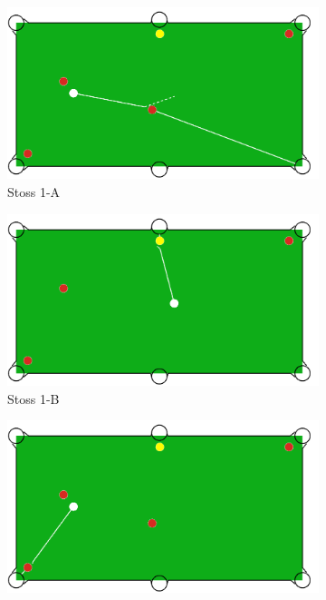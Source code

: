 \begin{figure}[h!]
    \centering
    \begin{subfigure}[b]{0.4\textwidth}
        \centering
        \includegraphics[width=1.0\linewidth]{../common/04_results/resources/simple_search/situation_diverse_solution_deep_search_1a.PNG}
        \caption{Stoss 1-A}
        \label{fig:situation_2_solution_1a}
    \end{subfigure}
    \hfill
    \begin{subfigure}[b]{0.4\textwidth}
        \centering
        \includegraphics[width=1.0\linewidth]{../common/04_results/resources/simple_search/situation_diverse_solution_deep_search_1b.PNG}
        \caption{Stoss 1-B}
        \label{fig:situation_2_solution_1b}
    \end{subfigure}
    \hfill
    \begin{subfigure}[b]{0.4\textwidth}
        \centering
        \includegraphics[width=1.0\linewidth]{../common/04_results/resources/simple_search/situation_diverse_solution_deep_search_2a.PNG}

\end{subfigure}
\end{figure}
